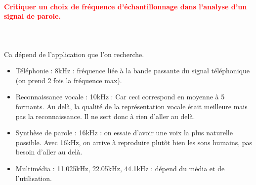 \documentclass[letterpaper, 12pt]{article}
\newcommand{\red}[1]{
	\textcolor{red}{#1}
}
\begin{document}
		\paragraph{\red{Critiquer un choix de fréquence d'échantillonnage dans l'analyse d'un signal de parole.}}
		~\\~\\
			Ca dépend de l'application que l'on recherche.
			\begin{itemize}
				\setlength{\itemsep}{0pt}		
				\setlength{\parskip}{0pt}		
				\setlength{\parsep}{0pt}	
				\item Téléphonie : 8kHz : fréquence liée à la bande passante du signal téléphonique 
					(on prend 2 fois la fréquence max).
				\item Reconnaissance vocale : 10kHz : Car ceci correspond en moyenne à 5 formants. Au delà, 
					la qualité de la représentation vocale était meilleure mais pas la reconnaissance. 
					Il ne sert donc à rien d'aller au delà.
				\item Synthèse de parole : 16kHz : on essaie d'avoir une voix la plus naturelle possible.
					Avec 16kHz, on arrive à reproduire plutôt bien les sons humains, pas besoin d'aller
					au delà.
				\item Multimédia : 11.025kHz, 22.05kHz, 44.1kHz : dépend du média et de l'utilisation.
			\end{itemize}
		
\end{document}
